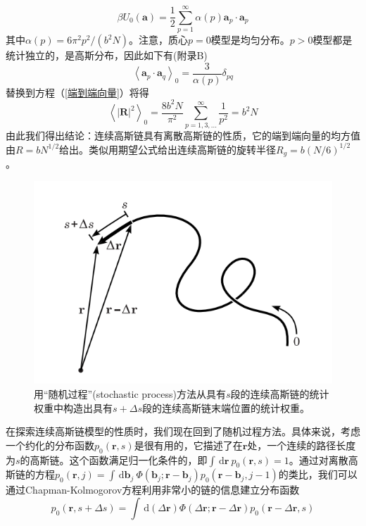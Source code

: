 \begin{equation}
\beta U_0(\mathbf{a})=\frac{1}{2}\sum_{p=1}^{\infty}\alpha (p)\mathbf{a}_p \cdot \mathbf{a}_p
\end{equation}
其中$\alpha (p)=6\pi ^2p^2/(b^2N)$。注意，质心$p=0$模型是均匀分布。$p>0$模型都是统计独立的，是高斯分布，因此如下有(附录B)
\begin{equation}
\left \langle \mathbf{a}_p \cdot \mathbf{a}_q \right \rangle _0=\frac{3}{\alpha (p)}\delta _{pq}
\end{equation}
替换到方程（\ref{端到端向量}）将得
\begin{equation}
\left \langle \left| \mathbf{R} \right|^2 \right \rangle _0=\frac{8b^2N}{\pi ^2}\sum_{p=1,3,...}^{\infty}\frac{1}{p^2}=b^2N
\end{equation}
由此我们得出结论：连续高斯链具有离散高斯链的性质，它的端到端向量的均方值由$R=bN^{1/2}$给出。类似用期望公式给出连续高斯链的旋转半径$R_g=b(N/6)^{1/2}$。

\begin{figure}[H]
\centering
\includegraphics[scale=0.7]{./figures/42.png}
\caption{用“随机过程”(stochastic process)方法从具有$s$段的连续高斯链的统计权重中构造出具有$s+\Delta s$段的连续高斯链末端位置的统计权重。} \label{随机过程}
\end{figure}

在探索连续高斯链模型的性质时，我们现在回到了随机过程方法。具体来说，考虑一个约化的分布函数$p_0 (\mathbf{r},s)$是很有用的，它描述了在$\mathbf {r}$处，一个连续的路径长度为$s$的高斯链。这个函数满足归一化条件的，即$\int \, \mathrm{d} \mathbf{r}~p_0(\mathbf{r},s)=1$。通过对离散高斯链的方程$p_0(\mathbf{r},j)=\int \, \mathrm{d} \mathbf{b}_j~\Phi(\mathbf{b}_j;\mathbf{r}-\mathbf{b}_j)p_0(\mathbf{r}-\mathbf{b}_j,j-1)$的类比，我们可以通过Chapman-Kolmogorov方程利用非常小的链的信息建立分布函数
\begin{equation}
p_0(\mathbf{r},s+\Delta s)=\int \, \mathrm{d}(\Delta \mathbf{r})\Phi(\Delta \mathbf{r};\mathbf{r}-\Delta \mathbf{r})p_0(\mathbf{r}-\Delta \mathbf{r},s) \label{分布函数}
\end{equation}

